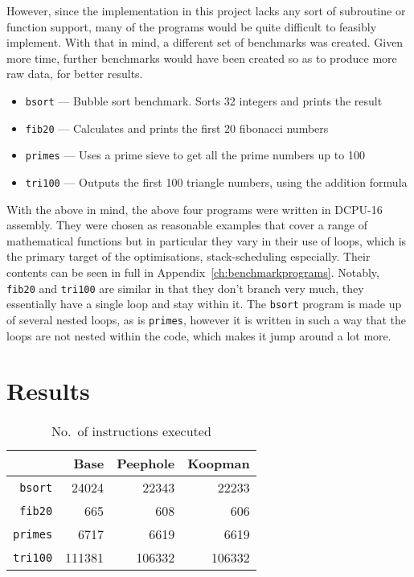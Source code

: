 However, since the implementation in this project lacks any sort of subroutine
or function support, many of the programs would be quite difficult to feasibly
implement. With that in mind, a different set of benchmarks was created. Given
more time, further benchmarks would have been created so as to produce more
raw data, for better results.

\begin{itemize}[noitemsep]
  \item \texttt{bsort} --- Bubble sort benchmark. Sorts 32 integers and prints
  the result
  \item \texttt{fib20} --- Calculates and prints the first 20 fibonacci numbers
  \item \texttt{primes} --- Uses a prime sieve to get all the prime numbers up
  to 100
  \item \texttt{tri100} --- Outputs the first 100 triangle numbers, using the
    addition formula
\end{itemize}

With the above in mind, the above four programs were written in DCPU-16
assembly. They were chosen as reasonable examples that cover a range of
mathematical functions but in particular they vary in their use of loops, which
is the primary target of the optimisations, stack-scheduling especially. Their
contents can be seen in full in Appendix~\ref{ch:benchmarkprograms}. Notably,
\texttt{fib20} and \texttt{tri100} are similar in that they don't branch very
much, they essentially have a single loop and stay within it. The \texttt{bsort}
program is made up of several nested loops, as is \texttt{primes}, however it is
written in such a way that the loops are not nested within the code, which makes
it jump around a lot more.

\section{Results}

\begin{table}
  \begin{tabular}{r r r r}
                    &   Base & Peephole & Koopman \\ \toprule
    \texttt{bsort}  &  24024 &    22343 &   22233 \\ \midrule
    \texttt{fib20}  &    665 &      608 &     606 \\ \midrule
    \texttt{primes} &   6717 &     6619 &    6619 \\ \midrule
    \texttt{tri100} & 111381 &   106332 &  106332 \\ \midrule
  \end{tabular}
  \caption{No.\ of instructions executed}\label{tab:instructions}
\end{table}

